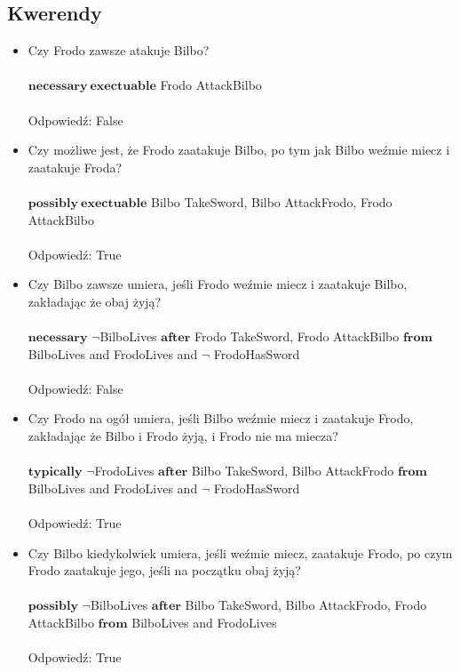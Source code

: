 \documentclass[11pt,a4paper]{article}
\begin{document}
\subsection{Kwerendy}
\begin{itemize}
\item Czy Frodo zawsze atakuje Bilbo? \\ \\
$\mathbf{necessary~exectuable}$ Frodo AttackBilbo \\ \\
Odpowiedź: False

\item Czy możliwe jest, że Frodo zaatakuje Bilbo, po tym jak Bilbo weźmie miecz i zaatakuje Froda? \\ \\
$\mathbf{possibly~exectuable}$ Bilbo TakeSword, Bilbo AttackFrodo, Frodo AttackBilbo \\ \\
Odpowiedź: True

\item Czy Bilbo zawsze umiera, jeśli Frodo weźmie miecz i zaatakuje Bilbo, zakładając że obaj żyją? \\ \\
$\mathbf{necessary}$ $\neg$BilboLives $\mathbf{after}$ Frodo TakeSword, Frodo AttackBilbo $\mathbf{from}$ BilboLives and FrodoLives and $\neg$ FrodoHasSword \\ \\
Odpowiedź: False

\item Czy Frodo na ogół umiera, jeśli Bilbo weźmie miecz i zaatakuje Frodo, zakładając że Bilbo i Frodo żyją, i Frodo nie ma miecza? \\ \\
$\mathbf{typically}$ $\neg$FrodoLives $\mathbf{after}$ Bilbo TakeSword, Bilbo AttackFrodo $\mathbf{from}$ BilboLives and FrodoLives and $\neg$ FrodoHasSword \\ \\
Odpowiedź: True

\item Czy Bilbo kiedykolwiek umiera, jeśli weźmie miecz, zaatakuje Frodo, po czym Frodo zaatakuje jego, jeśli na początku obaj żyją? \\ \\
$\mathbf{possibly}$ $\neg$BilboLives $\mathbf{after}$ Bilbo TakeSword, Bilbo AttackFrodo, Frodo AttackBilbo $\mathbf{from}$ BilboLives and FrodoLives \\ \\
Odpowiedź: True


\end{itemize}
\end{document}

